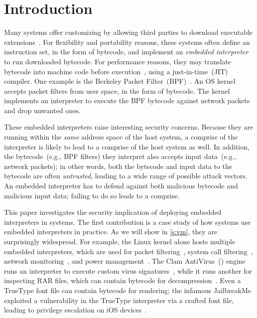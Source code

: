\section{Introduction}
\label{s:intro}

Many systems offer customizing by allowing third parties to download executable
extensions~\cite{engler:exokernel}.  For flexibility and portability reasons,
these systems often define an instruction set, in the form of bytecode, and
implement an \emph{embedded interpreter} to run downloaded bytecode.  For
performance reasons, they may translate bytecode into machine code before
execution~\cite{engler:vcode}, using a just-in-time~(JIT) compiler.
%
One example is the Berkeley Packet Filter~(BPF)~\cite{mccanne:bpf}.  An OS
kernel accepts packet filters from user space, in the form of bytecode.  The
kernel implements an interpreter to execute the BPF bytecode against network
packets and drop unwanted ones.

These embedded interpreters raise interesting security concerns.
Because they are running within the \emph{same} address
space of the host system, a comprise of the interpreter is likely to
lead to a comprise of the host system as well.
In addition, the bytecode~(e.g., BPF filters)
they interpret also accepts input data~(e.g., network packets);
in other words,
both the bytecode and input data to the bytecode
are often \emph{untrusted},
leading to a wide range of possible attack vectors.
An embedded interpreter has to defend against both
malicious bytecode and malicious input data;
failing to do so leads to a comprise.

This paper investigates the security implication of
deploying embedded interpreters in systems.
The first contribution is
a case study of how systems use embedded interpreters in practice.
As we will show in \autoref{s:vm},
they are surprisingly widespread.
For example,
the Linux kernel alone hosts multiple embedded interpreters,
which are used for packet filtering~\cite{mccanne:bpf},
system call filtering~\cite{seccomp-bpf},
network monitoring~\cite{inetdiag:ss},
and power management~\cite{aml:spec}.
The Clam AntiVirus~(\clamav) engine
runs an interpreter to execute custom virus signatures~\cite{clamav:llvm},
while it runs another for inspecting RAR files,
which can contain bytecode for decompression~\cite{rar:vm}.
Even a TrueType font file can contain bytecode for rendering;
the infamous JailbreakMe exploited a vulnerability in the TrueType
interpreter via a crafted font file, leading to privilege escalation on iOS
devices~\cite{sigwald:jailbreakme}.

